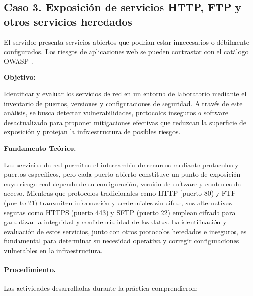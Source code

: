 \subsection{Caso 3. Exposición de servicios HTTP, FTP y otros servicios heredados}
\label{caso:servicios-heredados}

\begin{situacion}
El servidor presenta servicios abiertos que podrían estar innecesarios o débilmente configurados. Los riesgos de aplicaciones web se pueden contrastar con el catálogo OWASP \parencite{owasp2021}.

\textbf{Objetivo:} \par
Identificar y evaluar los servicios de red en un entorno de laboratorio mediante el inventario de puertos, versiones y configuraciones de seguridad. A través de este análisis, se busca detectar vulnerabilidades, protocolos inseguros o software desactualizado para proponer mitigaciones efectivas que reduzcan la superficie de exposición y protejan la infraestructura de posibles riesgos. \par
\textbf{Fundamento Teórico:} \par
Los servicios de red permiten el intercambio de recursos mediante protocolos y puertos específicos, pero cada puerto abierto constituye un punto de exposición cuyo riesgo real depende de su configuración, versión de software y controles de acceso. Mientras que protocolos tradicionales como HTTP (puerto 80) y FTP (puerto 21) transmiten información y credenciales sin cifrar, sus alternativas seguras como HTTPS (puerto 443) y SFTP (puerto 22) emplean cifrado para garantizar la integridad y confidencialidad de los datos. La identificación y evaluación de estos servicios, junto con otros protocolos heredados e inseguros, es fundamental para determinar su necesidad operativa y corregir configuraciones vulnerables en la infraestructura.
\end{situacion}

\paragraph{Procedimiento.}
Las actividades desarrolladas durante la práctica comprendieron:

